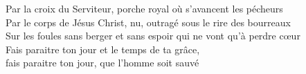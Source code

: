 Par la croix du Serviteur, porche royal où s'avancent les pécheurs\\
Par le corps de Jésus Christ, nu, outragé sous le rire des bourreaux\\
Sur les foules sans berger et sans espoir qui ne vont qu'à perdre cœur\\
Fais paraitre ton jour et le temps de ta grâce,\\
fais paraitre ton jour, que l’homme soit sauvé
